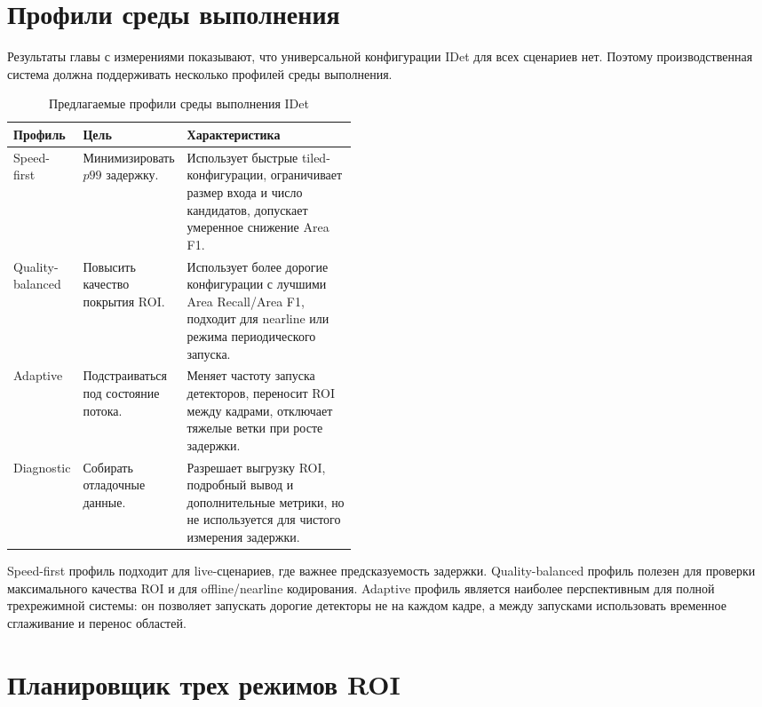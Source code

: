 \documentclass[12pt,a4paper,oneside,openany]{report}
\begin{document}

\section{Профили среды выполнения}

Результаты главы с измерениями показывают, что универсальной конфигурации IDet для всех
сценариев нет. Поэтому производственная система должна поддерживать несколько профилей среды
выполнения.

\begin{table}[!htbp]
  \centering
  \caption{Предлагаемые профили среды выполнения IDet}
  \label{tab:runtime_profiles}
  \small
  \begin{tabularx}{\linewidth}{@{}P{0.20\linewidth}P{0.25\linewidth}Y@{}}
    \toprule
    Профиль & Цель & Характеристика \\
    \midrule
    Speed-first &
    Минимизировать $p99$ задержку. &
    Использует быстрые tiled-конфигурации, ограничивает размер входа и число кандидатов,
      допускает умеренное снижение Area F1. \\
    Quality-balanced &
    Повысить качество покрытия ROI. &
    Использует более дорогие конфигурации с лучшими Area Recall/Area F1, подходит для nearline
      или режима периодического запуска. \\
    Adaptive &
    Подстраиваться под состояние потока. &
    Меняет частоту запуска детекторов, переносит ROI между кадрами, отключает тяжелые ветки при
      росте задержки. \\
    Diagnostic &
    Собирать отладочные данные. &
    Разрешает выгрузку ROI, подробный вывод и дополнительные метрики, но не используется для
      чистого измерения задержки. \\
    \bottomrule
  \end{tabularx}
\end{table}

Speed-first профиль подходит для live-сценариев, где важнее предсказуемость задержки.
Quality-balanced профиль полезен для проверки максимального качества ROI и для offline/nearline
кодирования. Adaptive профиль является наиболее перспективным для полной трехрежимной системы:
он позволяет запускать дорогие детекторы не на каждом кадре, а между запусками использовать
временное сглаживание и перенос областей.


\section{Планировщик трех режимов ROI}
\end{document}
